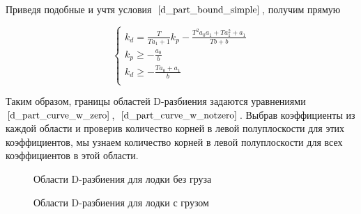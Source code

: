 \documentclass[12pt,a4paper]{article}
\begin{document}
Приведя подобные и учтя условия~$\eqref{d_part_bound_simple}$, получим прямую

\begin{equation}
	\label{d_part_curve_w_notzero}
	\begin{cases}
		k_d = \frac{T}{Ta_1+1}k_p - \frac{T^2a_0a_1 + Ta_1^2+a_1}{Tb+b} \\
		k_p \ge -\frac{a_0}{b} \\
		k_d \ge -\frac{Ta_0+a_1}{b} \\
	\end{cases}
\end{equation}

Таким образом, границы областей D-разбиения задаются уравнениями~$\eqref{d_part_curve_w_zero}$,~$\eqref{d_part_curve_w_notzero}$. Выбрав коэффициенты из каждой области и проверив количество корней в левой полуплоскости для этих коэффициентов, мы узнаем количество корней в левой полуплоскости для всех коэффициентов в этой области.

\begin{figure}
	\caption{Области D-разбиения для лодки без груза}
\end{figure}

\begin{figure}
	\caption{Области D-разбиения для лодки с грузом}
\end{figure}
\end{document}
